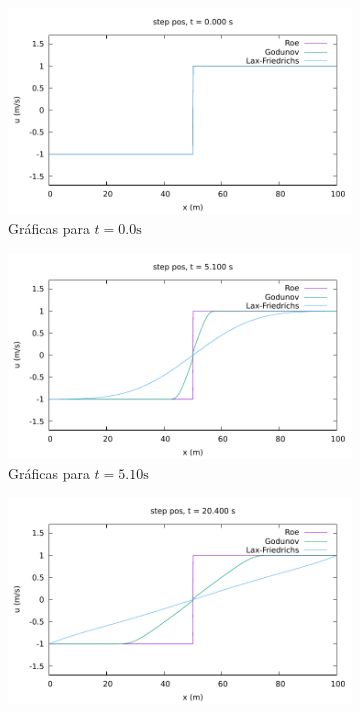 \documentclass[12pt]{article}
\begin{document}
\begin{figure}[h]
	\centering
	\begin{subfigure}[b]{0.49\textwidth}
		\includegraphics[width=\textwidth]{../burgers1DVF/results/sol_fijas/step_pos/000.pdf}
		\caption*{Gráficas para $t=0.0\unit{\second}$}
		\label{fig:step_pos-fija1}
	\end{subfigure}
	\vfill
	\begin{subfigure}[b]{0.49\textwidth}
		\includegraphics[width=\textwidth]{../burgers1DVF/results/sol_fijas/step_pos/170.pdf}
		\caption*{Gráficas para $t=5.10\unit{\second}$}
		\label{fig:step_pos-fija2}
	\end{subfigure}
	\vfill
	\begin{subfigure}[b]{0.49\textwidth}
		\includegraphics[width=\textwidth]{../burgers1DVF/results/sol_fijas/step_pos/680.pdf}

\end{subfigure}
\end{figure}
\end{document}
